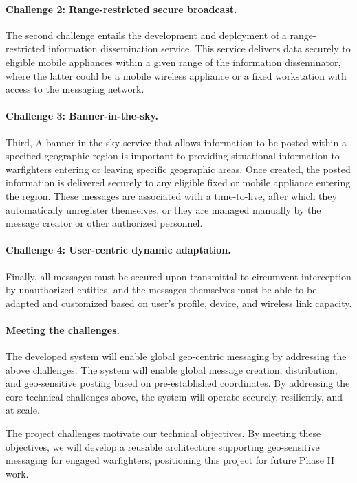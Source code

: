 \documentclass{sbir}
\begin{document}
\paragraph{Challenge 2: Range-restricted secure broadcast.} The second challenge entails the development and deployment of a range-restricted information dissemination service. This service delivers data securely to eligible mobile appliances within a given range of the information disseminator, where the latter could be a mobile wireless appliance or a fixed workstation with access to the messaging network.

\paragraph{Challenge 3: Banner-in-the-sky.} Third, A banner-in-the-sky service that allows information to be posted within a specified geographic region is important to providing situational information to warfighters entering or leaving specific geographic areas. Once created, the posted information is  delivered securely to any eligible fixed or mobile appliance entering the region. These messages are associated with a time-to-live, after which they automatically unregister themselves, or they are managed manually by the message creator or other authorized personnel.

\paragraph{Challenge 4: User-centric dynamic adaptation.} Finally, all messages must be secured upon transmittal to circumvent interception by unauthorized entities, and the messages themselves must be able to be adapted and customized based on user's profile, device, and wireless link capacity.

\paragraph{Meeting the challenges.} The developed system will enable global geo-centric messaging by addressing the above challenges. The system will enable global message creation, distribution, and geo-sensitive posting based on pre-established coordinates. By addressing the core technical challenges above, the system will operate securely, resiliently, and at scale.

{The project challenges motivate our technical objectives. By meeting these objectives, we will develop a reusable architecture supporting geo-sensitive messaging for engaged warfighters, positioning this project for future Phase II work.}
\end{document}
